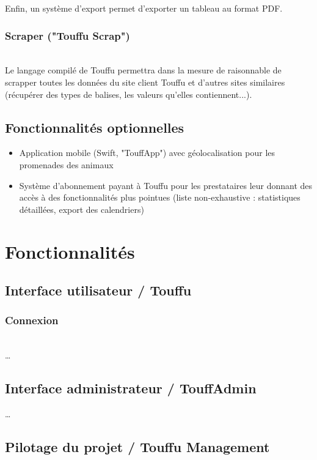 \documentclass[conference]{IEEEtran}
\begin{document}
Enfin, un système d'export permet d'exporter un tableau au format PDF.\\

\subsubsection{Scraper ("Touffu Scrap")}\hfill\\

Le langage compilé de Touffu permettra dans la mesure de raisonnable de scrapper toutes les données du site client Touffu et d'autres sites similaires (récupérer des types de balises, les valeurs qu'elles contiennent...).

\subsection{Fonctionnalités optionnelles}
\begin{itemize}
	\item Application mobile (Swift, "TouffApp") avec géolocalisation pour les promenades des animaux
	\item Système d'abonnement payant à Touffu pour les prestataires leur donnant des accès à des fonctionnalités plus pointues (liste non-exhaustive : statistiques détaillées, export des calendriers)
\end{itemize}


\section{Fonctionnalités}

\subsection{Interface utilisateur / Touffu}

\subsubsection{Connexion}
\hfil\\
…

\subsection{Interface administrateur / TouffAdmin}
…

\subsection{Pilotage du projet / Touffu Management}
\end{document}
